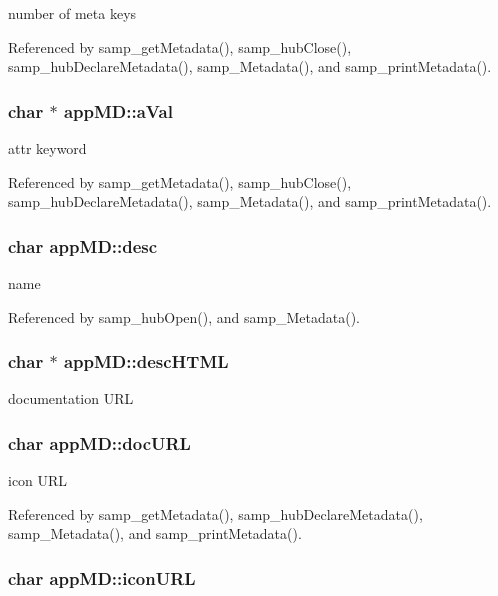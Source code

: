 number of meta keys 

Referenced by samp\_\-getMetadata(), samp\_\-hubClose(), samp\_\-hubDeclareMetadata(), samp\_\-Metadata(), and samp\_\-printMetadata().\hypertarget{structappMD_13ae9876a351aee3fe5b861733aff77a}{
\subsubsection[{aVal}]{\setlength{\rightskip}{0pt plus 5cm}char $\ast$ {\bf appMD::aVal}}}
\label{structappMD_13ae9876a351aee3fe5b861733aff77a}


attr keyword 

Referenced by samp\_\-getMetadata(), samp\_\-hubClose(), samp\_\-hubDeclareMetadata(), samp\_\-Metadata(), and samp\_\-printMetadata().\hypertarget{structappMD_fe527cb05f296f8e8b8144bf444beffd}{
\subsubsection[{desc}]{\setlength{\rightskip}{0pt plus 5cm}char {\bf appMD::desc}}}
\label{structappMD_fe527cb05f296f8e8b8144bf444beffd}


name 

Referenced by samp\_\-hubOpen(), and samp\_\-Metadata().\hypertarget{structappMD_652f4b568b3de167fa0886613c8c6656}{
\subsubsection[{descHTML}]{\setlength{\rightskip}{0pt plus 5cm}char $\ast$ {\bf appMD::descHTML}}}
\label{structappMD_652f4b568b3de167fa0886613c8c6656}


documentation URL \hypertarget{structappMD_53945cba18e159fcdd4fb627b1d1d312}{
\subsubsection[{docURL}]{\setlength{\rightskip}{0pt plus 5cm}char {\bf appMD::docURL}}}
\label{structappMD_53945cba18e159fcdd4fb627b1d1d312}


icon URL 

Referenced by samp\_\-getMetadata(), samp\_\-hubDeclareMetadata(), samp\_\-Metadata(), and samp\_\-printMetadata().\hypertarget{structappMD_8ff19215559267a838fe300ca4f743a7}{
\subsubsection[{iconURL}]{\setlength{\rightskip}{0pt plus 5cm}char {\bf appMD::iconURL}}}
\label{structappMD_8ff19215559267a838fe300ca4f743a7}


